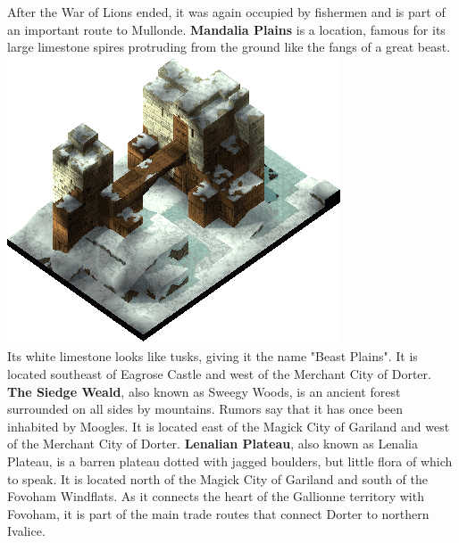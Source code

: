 After the War of Lions ended, it was again occupied by fishermen and is part of an important route to Mullonde.
\textbf{Mandalia Plains} is a location, famous for its large limestone spires protruding from the ground like the fangs of a great beast.
%
\vfill
\includegraphics[width=\columnwidth]{./art/images/zeakden.png}
\pagebreak\\
%
Its white limestone looks like tusks, giving it the name "Beast Plains". 
It is located southeast of Eagrose Castle and west of the Merchant City of Dorter.
\textbf{The Siedge Weald}, also known as Sweegy Woods, is an ancient forest surrounded on all sides by mountains. 
Rumors say that it has once been inhabited by Moogles. 
It is located east of the Magick City of Gariland and west of the Merchant City of Dorter.
\textbf{Lenalian Plateau}, also known as Lenalia Plateau, is a barren plateau dotted with jagged boulders, but little flora of which to speak.
It is located north of the Magick City of Gariland and south of the Fovoham Windflats.
As it connects the heart of the Gallionne territory with Fovoham, it is part of the main trade routes that connect Dorter to northern Ivalice.
%
\\\\
